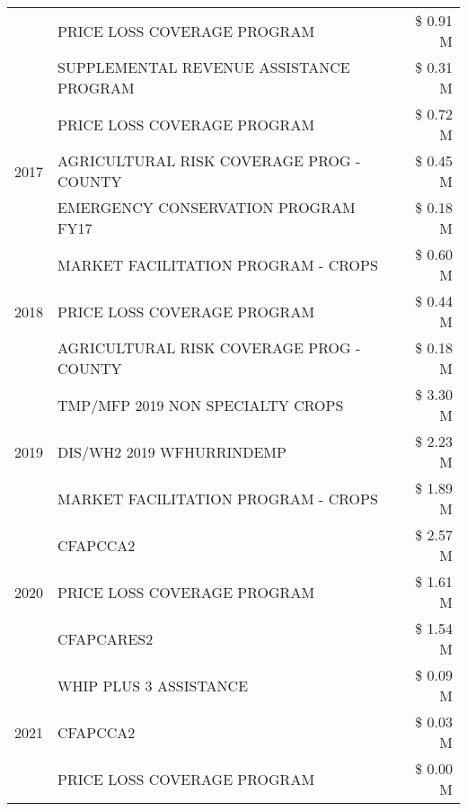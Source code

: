 \begin{tabular}{llr}
 & PRICE LOSS COVERAGE PROGRAM & \$ 0.91 M \\
 & SUPPLEMENTAL REVENUE ASSISTANCE PROGRAM & \$ 0.31 M \\
\cline{1-3}
\multirow[t]{3}{*}{2017} & PRICE LOSS COVERAGE PROGRAM & \$ 0.72 M \\
 & AGRICULTURAL RISK COVERAGE PROG - COUNTY & \$ 0.45 M \\
 & EMERGENCY CONSERVATION PROGRAM FY17 & \$ 0.18 M \\
\cline{1-3}
\multirow[t]{3}{*}{2018} & MARKET FACILITATION PROGRAM - CROPS & \$ 0.60 M \\
 & PRICE LOSS COVERAGE PROGRAM & \$ 0.44 M \\
 & AGRICULTURAL RISK COVERAGE PROG - COUNTY & \$ 0.18 M \\
\cline{1-3}
\multirow[t]{3}{*}{2019} & TMP/MFP 2019 NON SPECIALTY CROPS & \$ 3.30 M \\
 & DIS/WH2 2019 WFHURRINDEMP & \$ 2.23 M \\
 & MARKET FACILITATION PROGRAM - CROPS & \$ 1.89 M \\
\cline{1-3}
\multirow[t]{3}{*}{2020} & CFAPCCA2 & \$ 2.57 M \\
 & PRICE LOSS COVERAGE PROGRAM & \$ 1.61 M \\
 & CFAPCARES2 & \$ 1.54 M \\
\cline{1-3}
\multirow[t]{3}{*}{2021} & WHIP PLUS 3 ASSISTANCE & \$ 0.09 M \\
 & CFAPCCA2 & \$ 0.03 M \\
 & PRICE LOSS COVERAGE PROGRAM & \$ 0.00 M \\
\cline{1-3}
\bottomrule
\end{tabular}

